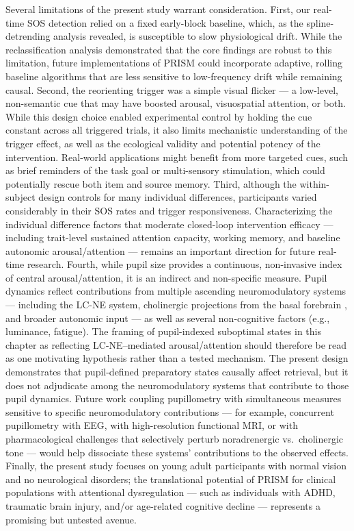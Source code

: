 Several limitations of the present study warrant consideration. First, our real-time SOS detection relied on a fixed early-block baseline, which, as the spline-detrending analysis revealed, is susceptible to slow physiological drift. While the reclassification analysis demonstrated that the core findings are robust to this limitation, future implementations of PRISM could incorporate adaptive, rolling baseline algorithms that are less sensitive to low-frequency drift while remaining causal. Second, the reorienting trigger was a simple visual flicker — a low-level, non-semantic cue that may have boosted arousal, visuospatial attention, or both. While this design choice enabled experimental control by holding the cue constant across all triggered trials, it also limits mechanistic understanding of the trigger effect, as well as the ecological validity and potential potency of the intervention. Real-world applications might benefit from more targeted cues, such as brief reminders of the task goal or multi-sensory stimulation, which could potentially rescue both item and source memory. Third, although the within-subject design controls for many individual differences, participants varied considerably in their SOS rates and trigger responsiveness. Characterizing the individual difference factors that moderate closed-loop intervention efficacy — including trait-level sustained attention capacity, working memory, and baseline autonomic arousal/attention — remains an important direction for future real-time research. Fourth, while pupil size provides a continuous, non-invasive index of central arousal/attention, it is an indirect and non-specific measure. Pupil dynamics reflect contributions from multiple ascending neuromodulatory systems --- including the LC-NE system, cholinergic projections from the basal forebrain \parencite{reimer2016pupil}, and broader autonomic input --- as well as several non-cognitive factors (e.g., luminance, fatigue). The framing of pupil-indexed suboptimal states in this chapter as reflecting LC-NE--mediated arousal/attention should therefore be read as one motivating hypothesis rather than a tested mechanism. The present design demonstrates that pupil-defined preparatory states causally affect retrieval, but it does not adjudicate among the neuromodulatory systems that contribute to those pupil dynamics. Future work coupling pupillometry with simultaneous measures sensitive to specific neuromodulatory contributions --- for example, concurrent pupillometry with EEG, with high-resolution functional MRI, or with pharmacological challenges that selectively perturb noradrenergic vs.\ cholinergic tone --- would help dissociate these systems' contributions to the observed effects. Finally, the present study focuses on young adult participants with normal vision and no neurological disorders; the translational potential of PRISM for clinical populations with attentional dysregulation — such as individuals with ADHD, traumatic brain injury, and/or age-related cognitive decline — represents a promising but untested avenue.

